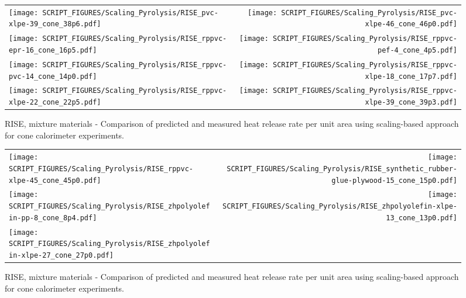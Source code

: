 \begin{figure}[p]
\begin{tabular*}{\textwidth}{l@{\extracolsep{\fill}}r}
\texttt{[image: SCRIPT\_FIGURES/Scaling\_Pyrolysis/RISE\_pvc-xlpe-39\_cone\_38p6.pdf]} &
\texttt{[image: SCRIPT\_FIGURES/Scaling\_Pyrolysis/RISE\_pvc-xlpe-46\_cone\_46p0.pdf]} \\
\texttt{[image: SCRIPT\_FIGURES/Scaling\_Pyrolysis/RISE\_rppvc-epr-16\_cone\_16p5.pdf]} &
\texttt{[image: SCRIPT\_FIGURES/Scaling\_Pyrolysis/RISE\_rppvc-pef-4\_cone\_4p5.pdf]} \\
\texttt{[image: SCRIPT\_FIGURES/Scaling\_Pyrolysis/RISE\_rppvc-pvc-14\_cone\_14p0.pdf]} &
\texttt{[image: SCRIPT\_FIGURES/Scaling\_Pyrolysis/RISE\_rppvc-xlpe-18\_cone\_17p7.pdf]} \\
\texttt{[image: SCRIPT\_FIGURES/Scaling\_Pyrolysis/RISE\_rppvc-xlpe-22\_cone\_22p5.pdf]} &
\texttt{[image: SCRIPT\_FIGURES/Scaling\_Pyrolysis/RISE\_rppvc-xlpe-39\_cone\_39p3.pdf]} \\
\end{tabular*}
\caption[HRRPUA of RISE Materials using scaling model, mixtures materials]
{RISE, mixture materials - Comparison of predicted and measured heat release rate per unit area using scaling-based approach for cone calorimeter experiments.}
\label{RISE_Materials_HRR_Mixtures4}
\end{figure}

\begin{figure}[p]
\begin{tabular*}{\textwidth}{l@{\extracolsep{\fill}}r}
\texttt{[image: SCRIPT\_FIGURES/Scaling\_Pyrolysis/RISE\_rppvc-xlpe-45\_cone\_45p0.pdf]} &
\texttt{[image: SCRIPT\_FIGURES/Scaling\_Pyrolysis/RISE\_synthetic\_rubber-glue-plywood-15\_cone\_15p0.pdf]} \\
\texttt{[image: SCRIPT\_FIGURES/Scaling\_Pyrolysis/RISE\_zhpolyolefin-pp-8\_cone\_8p4.pdf]} &
\texttt{[image: SCRIPT\_FIGURES/Scaling\_Pyrolysis/RISE\_zhpolyolefin-xlpe-13\_cone\_13p0.pdf]} \\
\texttt{[image: SCRIPT\_FIGURES/Scaling\_Pyrolysis/RISE\_zhpolyolefin-xlpe-27\_cone\_27p0.pdf]} &
\end{tabular*}
\caption[HRRPUA of RISE Materials using scaling model, mixtures materials]
{RISE, mixture materials - Comparison of predicted and measured heat release rate per unit area using scaling-based approach for cone calorimeter experiments.}
\label{RISE_Materials_HRR_Mixtures5}
\end{figure}

